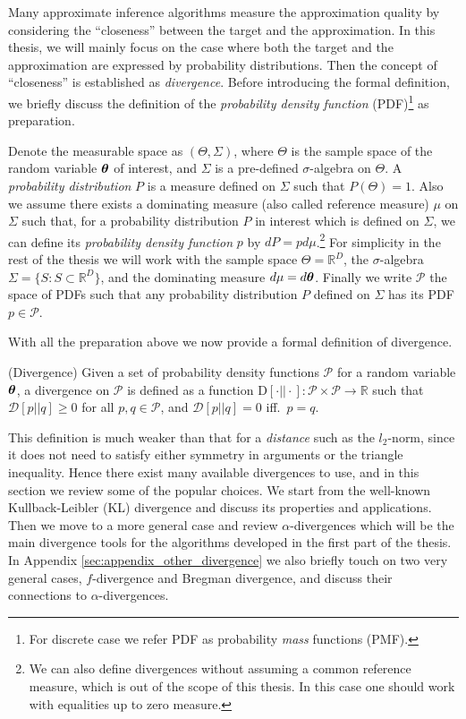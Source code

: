 Many approximate inference algorithms measure the approximation quality by considering the ``closeness'' between the target and the approximation. In this thesis, we will mainly focus on the case where both the target and the approximation are expressed by probability distributions. Then the concept of ``closeness'' is established as \emph{divergence}. Before introducing the formal definition, we briefly discuss the definition of the \emph{probability density function} (PDF)\footnote{For discrete case we refer PDF as probability \emph{mass} functions (PMF).} as preparation. 

Denote the measurable space as $(\Theta, \Sigma)$, where $\Theta$ is the sample space of the random variable $\bm{\theta}$ of interest, and $\Sigma$ is a pre-defined $\sigma$-algebra on $\Theta$. A \emph{probability distribution} $P$ is a measure defined on $\Sigma$ such that $P(\Theta) = 1$. Also we assume there exists a dominating measure (also called reference measure) $\mu$ on $\Sigma$ such that, for a probability distribution $P$ in interest which is defined on $\Sigma$, we can define its \emph{probability density function} $p$ by $dP = pd\mu$.\footnote{We can also define divergences without assuming a common reference measure, which is out of the scope of this thesis. In this case one should work with equalities up to zero measure.}
%
For simplicity in the rest of the thesis we will work with the sample space $\Theta = \mathbb{R}^D$, the $\sigma$-algebra $\Sigma = \{ S: S \subset \mathbb{R}^D \}$, and the dominating measure $d\mu = d\bm{\theta}$. Finally we write $\mathcal{P}$ the space of PDFs such that any probability distribution $P$ defined on $\Sigma$ has its PDF $p \in \mathcal{P}$.

With all the preparation above we now provide a formal definition of divergence.
\begin{definition}
(Divergence)
Given a set of probability density functions $\mathcal{P}$ for a random variable $\bm{\theta}$, a divergence on $\mathcal{P}$ is defined as a function $\mathrm{D}[\cdot || \cdot]: \mathcal{P} \times \mathcal{P} \rightarrow \mathbb{R}$ such that $\mathcal{D}[p||q] \geq 0$ for all $p, q \in \mathcal{P}$, and $\mathcal{D}[p||q] = 0$ iff.~$p = q$. 
\end{definition}
%
This definition is much weaker than that for a \emph{distance} such as the $l_2$-norm, since it does not need to satisfy either symmetry in arguments or the triangle inequality. Hence there exist many available divergences to use, and in this section we review some of the popular choices. We start from the well-known Kullback-Leibler (KL) divergence and discuss its properties and applications. Then we move to a more general case and review $\alpha$-divergences which will be the main divergence tools for the algorithms developed in the first part of the thesis. In Appendix \ref{sec:appendix_other_divergence} we also briefly touch on two very general cases, $f$-divergence and Bregman divergence, and discuss their connections to $\alpha$-divergences.

